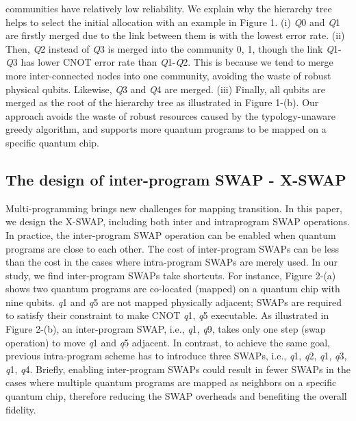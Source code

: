 \documentclass{article}
\begin{document}
				communities have relatively low reliability.
				We explain why the hierarchy tree helps to select the initial allocation with an example in Figure 1. (i) \textit{Q}0 and \textit{Q}1 are firstly merged
				due to the link between them is with the lowest error rate. (ii) Then,
				\textit{Q}2 instead of \textit{Q}3 is merged into the community {0, 1}, though the
				link \textit{Q}1-\textit{Q}3 has lower CNOT error rate than \textit{Q}1-\textit{Q}2. This is because
				we tend to merge more inter-connected nodes into one community,
				avoiding the waste of robust physical qubits. Likewise, \textit{Q}3 and \textit{Q}4
				are merged. (iii) Finally, all qubits are merged as the root of the
				hierarchy tree as illustrated in Figure 1-(b). Our approach avoids the
				waste of robust resources caused by the typology-unaware greedy
				algorithm, and supports more quantum programs to be mapped on
				a specific quantum chip.
				
			\subsection{The design of inter-program SWAP - X-SWAP}
				Multi-programming brings new challenges for mapping transition.
				In this paper, we design the X-SWAP, including both inter and intraprogram SWAP operations. In practice, the inter-program SWAP
				operation can be enabled when quantum programs are close to
				each other. The cost of inter-program SWAPs can be less than the
				cost in the cases where intra-program SWAPs are merely used.
				In our study, we find inter-program SWAPs take shortcuts. For
				instance, Figure 2-(a) shows two quantum programs are co-located
				(mapped) on a quantum chip with nine qubits. \textit{q}1 and \textit{q}5 are not
				mapped physically adjacent; SWAPs are required to satisfy their
				constraint to make CNOT \textit{q}1, \textit{q}5 executable. As illustrated in Figure
				2-(b), an inter-program SWAP, i.e., {\textit{q}1, \textit{q}9}, takes only one step (swap
				operation) to move \textit{q}1 and \textit{q}5 adjacent. In contrast, to achieve the
				same goal, previous intra-program scheme has to introduce three
				SWAPs, i.e., {\textit{q}1, \textit{q}2}, {\textit{q}1, \textit{q}3}, {\textit{q}1, \textit{q}4}. Briefly, enabling inter-program
				SWAPs could result in fewer SWAPs in the cases where multiple
				quantum programs are mapped as neighbors on a specific quantum
				chip, therefore reducing the SWAP overheads and benefiting the
				overall fidelity.
				
\end{document}
